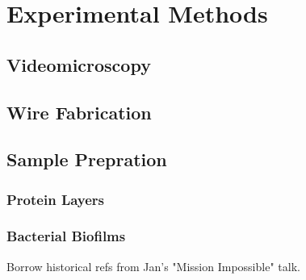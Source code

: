 \chapter{Experimental Methods}

\section{Videomicroscopy}
\section{Wire Fabrication}
\section{Sample Prepration}
\subsection{Protein Layers}
\subsection{Bacterial Biofilms}

Borrow historical refs from Jan's "Mission Impossible" talk.